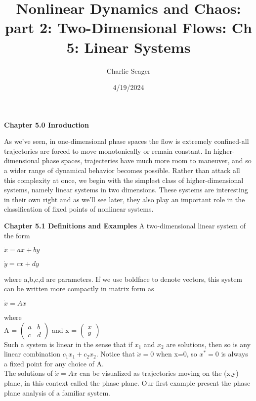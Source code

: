 \documentclass{article}
\newcommand\tab[1][1cm]{\hspace*{#1}}
\begin{document}
\title {Nonlinear Dynamics and Chaos: part 2: Two-Dimensional Flows: Ch 5: Linear Systems}

\author{Charlie Seager}

\date{4/19/2024}

\maketitle

\textbf {Chapter 5.0 Inroduction}

As we've seen, in one-dimensional phase spaces the flow is extremely confined-all trajectories are forced to move monotonically or remain constant. In higher-dimensional phase spaces, trajecteries have much more room to maneuver, and so a wider range of dynamical behavior becomes possible. Rather than attack all this complexity at once, we begin with the simplest class of higher-dimensional systems, namely linear systems in two dimensions. These systems are interesting in their own right and as we'll see later, they also play an important role in the classification of fixed points of nonlinear systems.

\textbf {Chapter 5.1 Definitions and Examples}
A two-dimensional linear system of the form
\begin{center}
$\dot{x}=ax+by$
\end{center}

\begin{center}
$\dot{y}=cx+dy$
\end{center}

where a,b,c,d are parameters. If we use boldface to denote vectors, this system can be written more compactly in matrix form as 
\begin{center}
$\dot{x}=Ax$
\end{center}
where 
\\ {A ={
$\begin{pmatrix}
a & b \\
c & d
\end{pmatrix}$
} and x = $
\begin{pmatrix}
x \\
y
\end{pmatrix}
$ } \\
Such a system is linear in the sense that if $x_{1}$ and $x_{2}$ are solutions, then so is any linear combination $c_{1}x_{1}+c_{2}x_{2}$. Notice that $\dot{x}=0$ when x=0, so $x^{*}=0$ is always a fixed point for any choice of A. \\ \tab
The solutions of $\dot{x}=Ax$ can be visualized as trajectories moving on the (x,y) plane, in this context called the phase plane. Our first example present the phase plane analysis of a familiar system.
\end{document}
